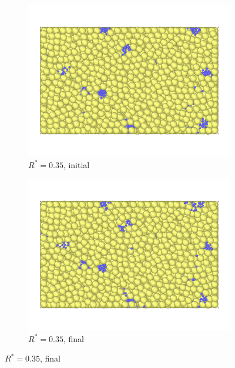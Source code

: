 \begin{figure}[!ht]
	\centering
	\begin{subfigure}[b]{\imagewidth}
		\centering
		\includegraphics[width=\textwidth]{chapters/figures/crush-fragments/0.35-1.png}
		\caption{$R^* = 0.35$, initial}
	\end{subfigure}
	\begin{subfigure}[b]{\imagewidth}
		\centering
		\includegraphics[width=\textwidth]{chapters/figures/crush-fragments/0.35-2.png}
		\caption{$R^* = 0.35$, final}
	\end{subfigure}


\end{figure}
